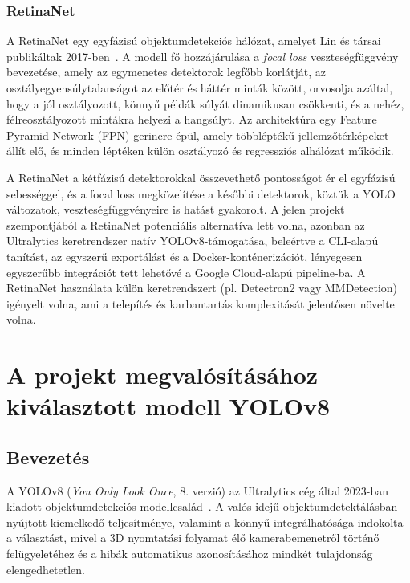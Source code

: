         \subsubsection{RetinaNet}

        A RetinaNet egy egyfázisú objektumdetekciós hálózat, amelyet Lin és társai publikáltak 2017-ben~\cite{retinanet}.
        A modell fő hozzájárulása a \textit{focal loss} veszteségfüggvény bevezetése, amely az egymenetes detektorok
        legfőbb korlátját, az osztályegyensúlytalanságot az előtér és háttér minták között, orvosolja azáltal, hogy
        a jól osztályozott, könnyű példák súlyát dinamikusan csökkenti, és a nehéz, félreosztályozott mintákra helyezi
        a hangsúlyt. Az architektúra egy Feature Pyramid Network (FPN) gerincre épül, amely többléptékű jellemzőtérképeket
        állít elő, és minden léptéken külön osztályozó és regressziós alhálózat működik.

        A RetinaNet a kétfázisú detektorokkal összevethető pontosságot ér el egyfázisú sebességgel, és a focal loss
        megközelítése a későbbi detektorok, köztük a YOLO változatok, veszteségfüggvényeire is hatást gyakorolt.
        A jelen projekt szempontjából a RetinaNet potenciális alternatíva lett volna, azonban az Ultralytics keretrendszer
        natív YOLOv8-támogatása, beleértve a CLI-alapú tanítást, az egyszerű exportálást és a Docker-konténerizációt,
        lényegesen egyszerűbb integrációt tett lehetővé a Google Cloud-alapú pipeline-ba. A RetinaNet használata
        külön keretrendszert (pl. Detectron2 vagy MMDetection) igényelt volna, ami a telepítés és karbantartás
        komplexitását jelentősen növelte volna.

    \section{A projekt megvalósításához kiválasztott modell YOLOv8}

    \subsection{Bevezetés}

        A YOLOv8 (\textit{You Only Look Once}, 8. verzió) az Ultralytics cég által 2023-ban kiadott objektumdetekciós modellcsalád~\cite{yolov8}.
        A valós idejű objektumdetektálásban nyújtott kiemelkedő teljesítménye, valamint a könnyű integrálhatósága indokolta a választást,
        mivel a 3D nyomtatási folyamat élő kamerabemenetről történő felügyeletéhez és a hibák automatikus azonosításához
        mindkét tulajdonság elengedhetetlen.

